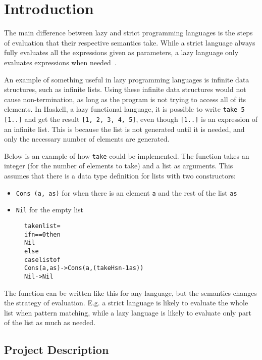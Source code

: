 \section{Introduction}

The main difference between lazy and strict programming languages is the steps
of evaluation that their respective semantics take. While a strict language
always fully evaluates all the expressions given as parameters, a lazy language
only evaluates expressions when needed~\cite{ThunkHas27:online}.

An example of something useful in lazy programming languages is
infinite data structures, such as infinite lists. Using
these infinite data structures would not cause non-termination, as long as the
program is not trying to access all of its elements. In Haskell, a lazy
functional language, it is possible to write \texttt{take 5 [1..]} and get the
result \texttt{[1, 2, 3, 4, 5]}, even though \texttt{[1..]} is
an expression of an infinite list. This is because the list is not generated
until it is needed, and only the necessary number of elements are generated.

Below is an example of how \texttt{take} could be implemented. The function
takes an integer (for the number of elements to take) and a list as arguments.
This assumes that there is a data type definition for lists with two
constructors:
\begin{itemize}
  \item \texttt{Cons (a, as)} for when there is an element \texttt{a} and the rest of the list \texttt{as}
  \item \texttt{Nil} for the empty list
\end{itemize}

\begin{figure}[!ht]
\begin{alltt}
take n list =
  if n == 0 then
    Nil
  else
    case list of
      Cons (a, as) -> Cons (a, (takeHs n-1 as))
      Nil -> Nil
  \end{alltt}
\end{figure}

The function can be written like this for any language, but the semantics
changes the strategy of evaluation. E.g. a strict language is likely to evaluate
the whole list when pattern matching, while a lazy language is likely to
evaluate only part of the list as much as needed. 


\subsection{Project Description}

